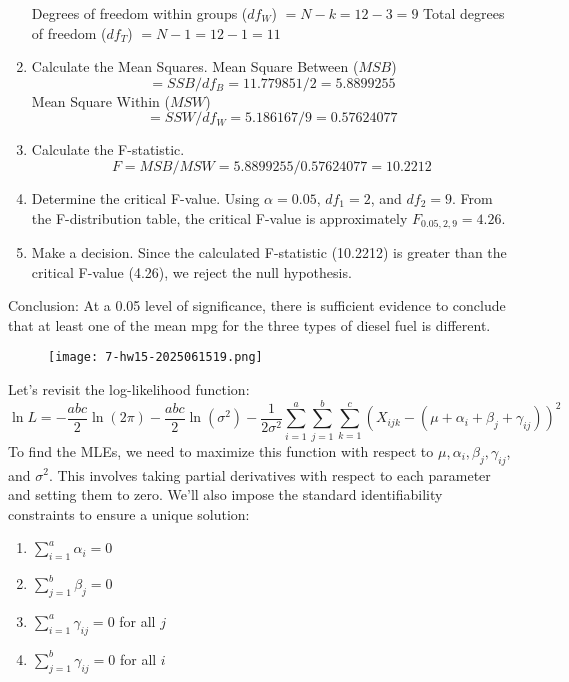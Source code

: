 \begin{enumerate}
Degrees of freedom within groups ($df_W$) $= N - k = 12 - 3 = 9$
Total degrees of freedom ($df_T$) $= N - 1 = 12 - 1 = 11$
	\item Calculate the Mean Squares.
Mean Square Between ($MSB$)
\[
= SSB / df_B = 11.779851 / 2 = 5.8899255
\]Mean Square Within ($MSW$)
\[
= SSW / df_W = 5.186167 / 9 = 0.57624077
\]	\item Calculate the F-statistic.
\[
F = MSB / MSW = 5.8899255 / 0.57624077 = 10.2212
\]	\item Determine the critical F-value.
Using $\alpha=0.05$, $df_1 = 2$, and $df_2 = 9$.
From the F-distribution table, the critical F-value is approximately $F_{0.05, 2, 9} = 4.26$.
	\item Make a decision.
Since the calculated F-statistic (10.2212) is greater than the critical F-value (4.26), we reject the null hypothesis.
\end{enumerate}

Conclusion:
At a 0.05 level of significance, there is sufficient evidence to conclude that at least one of the mean mpg for the three types of diesel fuel is different.

\begin{exercise}
\begin{figure}[H]
\centering
\texttt{[image: 7-hw15-2025061519.png]}
\label{}
\end{figure}
\end{exercise}
Let's revisit the log-likelihood function:
\[
\ln L = -\frac{abc}{2} \ln(2\pi) - \frac{abc}{2} \ln(\sigma^2) - \frac{1}{2\sigma^2} \sum_{i=1}^{a} \sum_{j=1}^{b} \sum_{k=1}^{c} (X_{ijk} - (\mu + \alpha_i + \beta_j + \gamma_{ij}))^2
\]
To find the MLEs, we need to maximize this function with respect to $\mu, \alpha_i, \beta_j, \gamma_{ij}$, and $\sigma^2$. This involves taking partial derivatives with respect to each parameter and setting them to zero. We'll also impose the standard identifiability constraints to ensure a unique solution:

\begin{enumerate}
	\item $\sum_{i=1}^{a} \alpha_i = 0$
	\item $\sum_{j=1}^{b} \beta_j = 0$
	\item $\sum_{i=1}^{a} \gamma_{ij} = 0$ for all $j$
	\item $\sum_{j=1}^{b} \gamma_{ij} = 0$ for all $i$
\end{enumerate}

